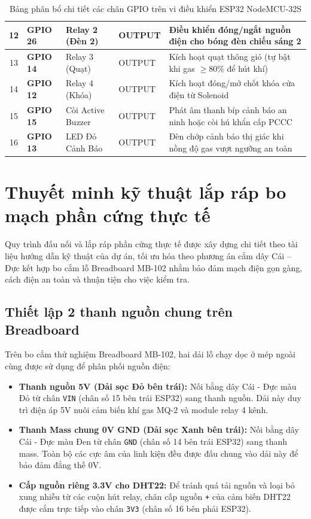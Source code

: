 \begin{table}[H]
\begin{tabularx}{\textwidth}{|c|p{2.2cm}|p{2.5cm}|p{2.0cm}|X|}
\hline
12 & \textbf{GPIO 26} & Relay 2 (Đèn 2) & OUTPUT & Điều khiển đóng/ngắt nguồn điện cho bóng đèn chiếu sáng 2 \\
\hline
13 & \textbf{GPIO 14} & Relay 3 (Quạt) & OUTPUT & Kích hoạt quạt thông gió (tự bật khi gas $\ge 80\%$ để hút khí) \\
\hline
14 & \textbf{GPIO 12} & Relay 4 (Khóa) & OUTPUT & Kích hoạt đóng/mở chốt khóa cửa điện từ Solenoid \\
\hline
15 & \textbf{GPIO 15} & Còi Active Buzzer & OUTPUT & Phát âm thanh bíp cảnh báo an ninh hoặc còi hú khẩn cấp PCCC \\
\hline
16 & \textbf{GPIO 13} & LED Đỏ Cảnh Báo & OUTPUT & Đèn chớp cảnh báo thị giác khi nồng độ gas vượt ngưỡng an toàn \\
\hline
\end{tabularx}
\caption{Bảng phân bổ chi tiết các chân GPIO trên vi điều khiển ESP32 NodeMCU-32S}
\label{tab:phan_bo_gpio}
\end{table}

\section{Thuyết minh kỹ thuật lắp ráp bo mạch phần cứng thực tế}
\label{sec:thuyet_minh_lap_rap}

Quy trình đấu nối và lắp ráp phần cứng thực tế được xây dựng chi tiết theo tài liệu hướng dẫn kỹ thuật của dự án, tối ưu hóa theo phương án cắm dây Cái – Đực kết hợp bo cắm lỗ Breadboard MB-102 nhằm bảo đảm mạch điện gọn gàng, cách điện an toàn và thuận tiện cho việc kiểm tra.

\subsection{Thiết lập 2 thanh nguồn chung trên Breadboard}
Trên bo cắm thử nghiệm Breadboard MB-102, hai dải lỗ chạy dọc ở mép ngoài cùng được sử dụng để phân phối nguồn điện:
\begin{itemize}
    \item \textbf{Thanh nguồn 5V (Dải sọc Đỏ bên trái):} Nối bằng dây Cái - Đực màu Đỏ từ chân \texttt{VIN} (chân số 15 bên trái ESP32) sang thanh nguồn. Dải này duy trì điện áp 5V nuôi cảm biến khí gas MQ-2 và module relay 4 kênh.
    \item \textbf{Thanh Mass chung 0V GND (Dải sọc Xanh bên trái):} Nối bằng dây Cái - Đực màu Đen từ chân \texttt{GND} (chân số 14 bên trái ESP32) sang thanh mass. Toàn bộ các cực âm của linh kiện đều được đấu chung vào dải này để bảo đảm đẳng thế 0V.
    \item \textbf{Cấp nguồn riêng 3.3V cho DHT22:} Để tránh quá tải nguồn và loại bỏ xung nhiễu từ các cuộn hút relay, chân cấp nguồn \texttt{+} của cảm biến DHT22 được cắm trực tiếp vào chân \texttt{3V3} (chân số 16 bên phải ESP32).
\end{itemize}

